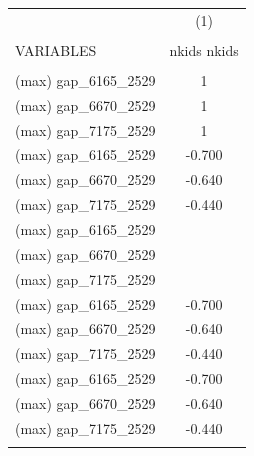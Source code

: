 \begin{tabular}{lc} \hline
 & (1) \\
 &  \\
VARIABLES & nkids nkids \\ \hline
 &  \\
(max) gap\_6165\_2529 & 1 \\
(max) gap\_6670\_2529 & 1 \\
(max) gap\_7175\_2529 & 1 \\
(max) gap\_6165\_2529 & -0.700 \\
(max) gap\_6670\_2529 & -0.640 \\
(max) gap\_7175\_2529 & -0.440 \\
(max) gap\_6165\_2529 &  \\
(max) gap\_6670\_2529 &  \\
(max) gap\_7175\_2529 &  \\
(max) gap\_6165\_2529 & -0.700 \\
(max) gap\_6670\_2529 & -0.640 \\
(max) gap\_7175\_2529 & -0.440 \\
(max) gap\_6165\_2529 & -0.700 \\
(max) gap\_6670\_2529 & -0.640 \\
(max) gap\_7175\_2529 & -0.440 \\
 &  \\ \hline
\end{tabular}
